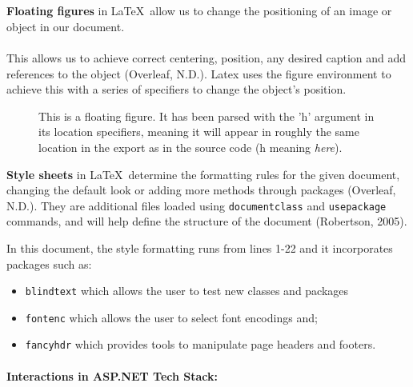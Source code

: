 \documentclass[a4paper, 11pt]{report}
\begin{document}
	\\
	\\
	\textbf{Floating figures} in \LaTeX\ allow us to change the positioning of an image or object in our document.
	\\
	\\This allows us to achieve correct centering, position, any desired caption and add references to the object (Overleaf, N.D.).
	Latex uses the figure environment to achieve this with a series of specifiers to change the object's position.
    \\
    \begin{figure}[h]
        \centering
        This is a floating figure. It has been parsed with the 'h' argument in its location specifiers, meaning it will appear in roughly the same location in the export as in the source code (h meaning \textit{here}).
    \end{figure}

    \textbf{Style sheets} in \LaTeX\ determine the formatting rules for the given document, changing the default look or adding more methods through packages (Overleaf, N.D.). They are additional files loaded using \texttt{documentclass{}} and \texttt{usepackage{}} commands, and will help define the structure of the document (Robertson, 2005).

    In this document, the style formatting runs from lines 1-22 and it incorporates packages such as:

    \begin{itemize}
        \item \texttt{blindtext} which allows the user to test new classes and packages
        \item \texttt{fontenc} which allows the user to select font encodings and;
        \item \texttt{fancyhdr} which provides tools to manipulate page headers and footers.
    \end{itemize}


    \paragraph{Interactions in ASP.NET Tech Stack:}
\end{document}
